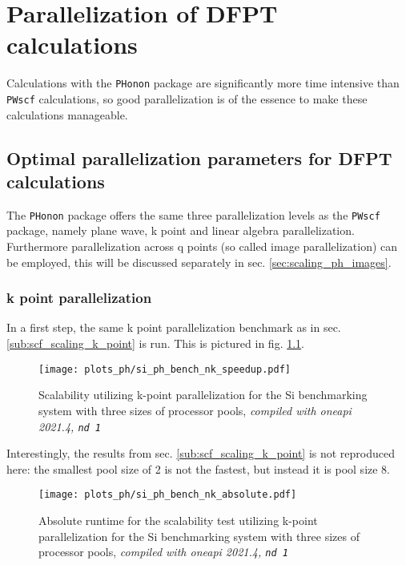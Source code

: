 \documentclass[main.tex]{subfiles}
\begin{document}
\chapter{Parallelization of DFPT calculations}\label{ch:optimization_ph}

Calculations with the \texttt{PHonon} package are significantly more time intensive than \texttt{PWscf} calculations, so good parallelization is of the essence to make these calculations manageable.

\section{Optimal parallelization parameters for DFPT calculations}

The \texttt{PHonon} package offers the same three parallelization levels as the \texttt{PWscf} package, namely plane wave, k point and linear algebra parallelization.
Furthermore parallelization across q points (so called image parallelization) can be employed, this will be discussed separately in sec. \ref{sec:scaling_ph_images}.

\subsection{k point parallelization}

In a first step, the same k point parallelization benchmark as in sec. \ref{sub:scf_scaling_k_point} is run. This is pictured in fig. \ref{fig:scaling_ph_nk_si}.

\begin{figure}[ht!]
    \centering
    \texttt{[image: plots\_ph/si\_ph\_bench\_nk\_speedup.pdf]}
    \caption{Scalability utilizing k-point parallelization for the Si benchmarking system with three sizes of processor pools, \emph{\QE compiled with \gls{oneapi} 2021.4, \texttt{nd 1}}}
    \label{fig:scaling_ph_nk_si}
\end{figure}
Interestingly, the results from sec. \ref{sub:scf_scaling_k_point} is not reproduced here: the smallest pool size of 2 is not the fastest, but instead it is pool size 8.

\begin{figure}[ht!]
    \centering
    \texttt{[image: plots\_ph/si\_ph\_bench\_nk\_absolute.pdf]}
    \caption{Absolute runtime for the scalability test utilizing k-point parallelization for the Si benchmarking system with three sizes of processor pools, \emph{\QE compiled with \gls{oneapi} 2021.4, \texttt{nd 1}}}
    \label{fig:scaling_ph_nk_si_absolute}
\end{figure}
\end{document}

